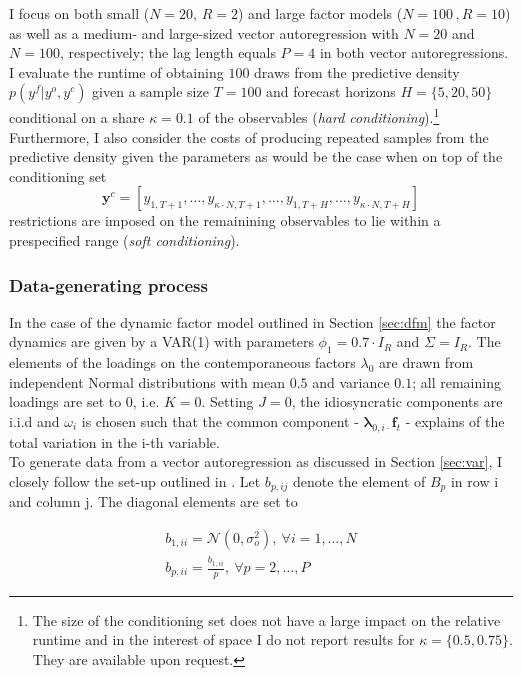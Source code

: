 \documentclass[notitlepage,a4paper,12pt]{article}
\begin{document}
I focus on both small ($N=20,\,R=2$) and large factor models ($N=100\,,R=10$) as well as a medium- and large-sized vector autoregression with $N=20$ and $N=100$, respectively; the lag length equals $P=4$ in both vector autoregressions. I evaluate the runtime of obtaining $100$ draws from the predictive density $p(y^f|y^o, y^c)$ given a sample size $T=100$ and forecast horizons $H = \{5, 20, 50\}$ conditional on a share $\kappa = 0.1$ of the observables (\textit{hard conditioning}).\footnote{The size of the conditioning set does not have a large impact on the relative runtime and in the interest of space I do not report results for $\kappa = \{0.5, 0.75\}$. They are available upon request.} Furthermore, I also consider the costs of producing repeated samples from the predictive density given the parameters as would be the case when on top of the conditioning set $$\mathbf{y}^{c} = [y_{1, T+1}, \dots, y_{\kappa \cdot N, T+1}, \dots, y_{1,T+H}, \dots, y_{\kappa \cdot N, T+H}]$$ restrictions are imposed on the remainining observables to lie within a prespecified range (\textit{soft conditioning}). 

\subsubsection{Data-generating process}

In the case of the dynamic factor model outlined in Section \ref{sec:dfm} the factor dynamics are given by a VAR(1) with parameters $\phi_1 = 0.7 \cdot I_R$ and $\Sigma = I_R$. The elements of the loadings on the contemporaneous factors $\lambda_0$ are drawn from independent Normal distributions with mean $0.5$ and variance $0.1$; all remaining loadings are set to 0, i.e. $K=0$. Setting $J=0$, the idiosyncratic components are i.i.d and $\omega_i$ is chosen such that the common component - $\boldsymbol{\lambda}_{0,i\cdot} \mathbf{f}_t$ - explains  of the total variation in the i-th variable. \\

To generate data from a vector autoregression as discussed in Section \ref{sec:var}, I closely follow the set-up outlined in \citet{CHP2020_ijf}. Let $b_{p, ij}$ denote the element of $B_p$ in row i and column j. The diagonal elements are set to

\begin{subequations}
    \begin{align}
        b_{1, ii} = \mathcal{N}(0, \sigma^2_o), \: \forall i = 1, \dots, N \\
b_{p, ii} = \frac{b_{1,ii}}{p}, \: \forall p = 2, \dots, P
    \end{align}    
\end{subequations}
\end{document}
